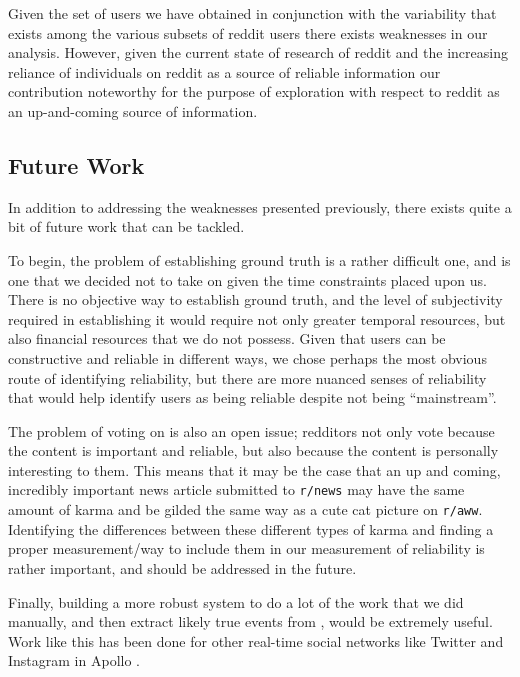 Given the set of users we have obtained in conjunction with the variability that
exists among the various subsets of reddit users there exists weaknesses in our
analysis. However, given the current state of research of reddit and the
increasing reliance of individuals on reddit as a source of reliable information
our contribution noteworthy for the purpose of exploration with respect to
reddit as an up-and-coming source of information.


\subsection{Future Work} %
\label{sub:future_work}
In addition to addressing the weaknesses presented previously, there exists
quite a bit of future work that can be tackled.

To begin, the problem of establishing ground truth is a rather difficult one,
and is one that we decided not to take on given the time constraints placed upon
us. There is no objective way to establish ground truth, and the level of
subjectivity required in establishing it would require not only greater temporal
resources, but also financial resources that we do not possess. Given that users
can be constructive and reliable in different ways, we chose perhaps the most
obvious route of identifying reliability, but there are more nuanced senses of
reliability that would help identify users as being reliable despite not being
``mainstream''.

The problem of voting on \reddit{} is also an open issue; redditors not only
vote because the content is important and reliable, but also because the content
is personally interesting to them. This means that it may be the case that an up
and coming, incredibly important news article submitted to \texttt{r/news} may
have the same amount of karma and be gilded the same way as a cute cat picture
on \texttt{r/aww}. Identifying the differences between these different types of
karma and finding a proper measurement/way to include them in our measurement of
reliability is rather important, and should be addressed in the future.

Finally, building a more robust system to do a lot of the work that we did
manually, and then extract likely true events from \reddit{}, would be extremely
useful. Work like this has been done for other real-time social networks like
Twitter and Instagram in Apollo \cite{Le:2011:DDL:2070942.2071018}.

